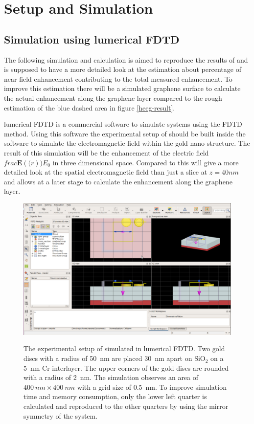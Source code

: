 \newpage
\section{Setup and Simulation}
\subsection{Simulation using lumerical FDTD}

The following simulation and calculation is aimed to reproduce the results of \cite{heeg} and is supposed to have a more detailed look at the estimation about percentage of near field enhancement contributing to the total measured enhancement. To improve this estimation there will be a simulated graphene surface to calculate the actual enhancement along the graphene layer compared to the rough estimation of the blue dashed area in figure \ref{heeg-result}.

lumerical FDTD is a commercial software to simulate systems using the FDTD method. Using this software the experimental setup of \cite{heeg} should be built inside the software to simulate the electromagnetic field within the gold nano structure. The result of this simulation will be the enhancement of the electric field $frac{\mathbf{E}(\mathbf(r))}{E_0}$ in three dimensional space. Compared to \cite{heeg} this will give a more detailed look at the spatial electromagnetic field than just a slice at $z=40nm$ and allows at a later stage to calculate the enhancement along the graphene layer.

\begin{figure}[!h]
  \includegraphics[width=\textwidth]{./images/lumerical.png}
  \label{lumerical}
  \caption{The experimental setup of \cite{heeg} simulated in lumerical FDTD. Two gold discs with a radius of \SI{50}{nm} are placed \SI{30}{nm} apart on SiO$_2$ on a \SI{5}{nm} Cr interlayer. The upper corners of the gold discs are rounded with a radius of \SI{2}{nm}. The simulation observes an area of $\SI{400}{nm}\times\SI{400}{nm}$ with a grid size of \SI{0.5}{nm}. To improve simulation time and memory consumption, only the lower left quarter is calculated and reproduced to the other quarters by using the mirror symmetry of the system.}
\end{figure}

